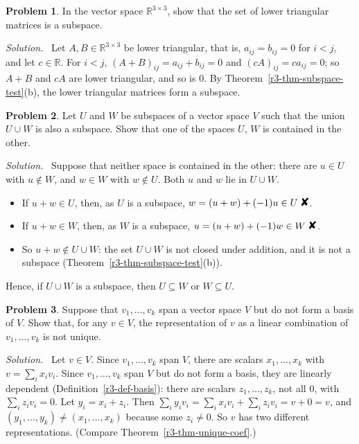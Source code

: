 \documentclass[12pt]{article}
\newcommand{\R}{\mathbb R}
\newcommand{\contradiction}{\mathord{\text{\large\ding{56}}}}
\theoremstyle{definition}
\newtheorem{problem}{Problem}
\newenvironment{solution}{\par\noindent\textit{Solution.}\ }{\par\smallskip}
\begin{document}
\begin{problem}\label{r3-ex-matrix-subspaces}
In the vector space \(\R^{3\times3}\), show that the set of lower triangular matrices is a
subspace.
\end{problem}
\begin{solution}
Let \(A,B\in\R^{3\times3}\) be lower triangular, that is, \(a_{ij}=b_{ij}=0\) for \(i<j\), and
let \(c\in\R\). For \(i<j\), \((A+B)_{ij}=a_{ij}+b_{ij}=0\) and \((cA)_{ij}=ca_{ij}=0\); so
\(A+B\) and \(cA\) are lower triangular, and so is \(0\). By
Theorem~\ref{r3-thm-subspace-test}(b), the lower triangular matrices form a subspace.
\end{solution}

\begin{problem}\label{r3-pr-union}
Let \(U\) and \(W\) be subspaces of a vector space \(V\) such that the union \(U\cup W\) is also a subspace. Show that
one of the spaces \(U\), \(W\) is contained in the other.
\end{problem}
\begin{solution}
Suppose that neither space is contained in the other: there are \(u\in U\) with \(u\notin W\), and \(w\in W\) with
\(w\notin U\). Both \(u\) and \(w\) lie in \(U\cup W\).
\begin{itemize}
\item If \(u+w\in U\), then, as \(U\) is a subspace, \(w=(u+w)+(-1)u\in U\ \contradiction\).
\item If \(u+w\in W\), then, as \(W\) is a subspace, \(u=(u+w)+(-1)w\in W\ \contradiction\).
\item So \(u+w\notin U\cup W\): the set \(U\cup W\) is not closed under addition, and it is not a subspace
(Theorem~\ref{r3-thm-subspace-test}(b)).
\end{itemize}
Hence, if \(U\cup W\) is a subspace, then \(U\subseteq W\) or \(W\subseteq U\).
\end{solution}

\begin{problem}\label{r3-ex-nonunique}
Suppose that \(v_1,\dots,v_k\) span a vector space \(V\) but do not form a basis of \(V\). Show
that, for any \(v\in V\), the representation of \(v\) as a linear combination of
\(v_1,\dots,v_k\) is not unique.
\end{problem}
\begin{solution}
Let \(v\in V\). Since \(v_1,\dots,v_k\) span \(V\), there are scalars \(x_1,\dots,x_k\) with
\(v=\sum_ix_iv_i\). Since \(v_1,\dots,v_k\) span \(V\) but do not form a basis, they are
linearly dependent (Definition~\ref{r3-def-basis}): there are scalars \(z_1,\dots,z_k\), not
all \(0\), with \(\sum_iz_iv_i=0\). Let \(y_i=x_i+z_i\). Then
\(\sum_iy_iv_i=\sum_ix_iv_i+\sum_iz_iv_i=v+0=v\), and
\((y_1,\dots,y_k)\ne(x_1,\dots,x_k)\) because some \(z_i\ne0\). So \(v\) has two different
representations. (Compare Theorem~\ref{r3-thm-unique-coef}.)
\end{solution}
\end{document}
